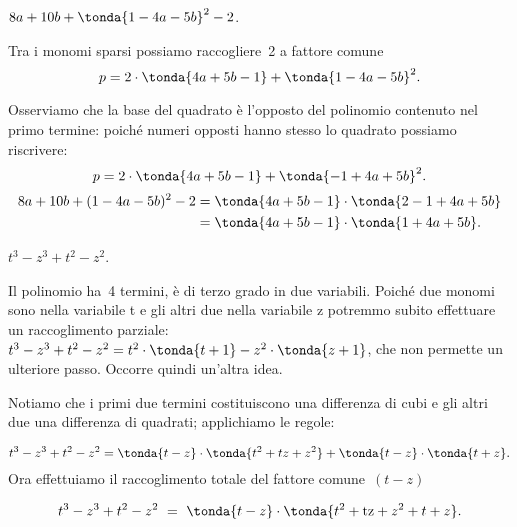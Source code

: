  \begin{esempio}
 \(8a+10b+\tonda{1-4a-5b}^{2}-2\).

Tra i monomi sparsi possiamo raccogliere~2 a fattore comune
\[p=2\cdot \tonda{4a+5b-1}+\tonda{1-4a-5b}^{2}.\]

Osserviamo che la base del quadrato è l'opposto del polinomio contenuto
nel primo termine: poiché numeri opposti hanno
stesso lo quadrato possiamo riscrivere:
\[p=2\cdot\tonda{4a+5b-1}+\tonda{-1+4a+5b}^{2}.\]
\begin{align*}
8a+10b+(1-4a-5b)^{2}-2&=\tonda{4a+5b-1}\cdot\tonda{2-1+4a+5b}\\
&=\tonda{4a+5b-1}\cdot\tonda{1+4a+5b}.
\end{align*}
 \end{esempio}

 \begin{esempio}
 \(t^{{3}}-z^{{3}}+t^{2}-z^{2}\).

Il polinomio ha~4 termini, è di terzo grado in due variabili.
Poiché due monomi sono nella variabile t e gli altri due nella
variabile z potremmo subito effettuare un raccoglimento
parziale:~\(t^{{3}}-z^{{3}}+t^{2}-z^{2}=
           t^{2}\cdot\tonda{t+1}-z^{2}\cdot \tonda{z+1}\),
che non permette un ulteriore passo. Occorre quindi un'altra idea.

Notiamo che i primi due termini costituiscono una differenza di cubi e
gli altri due una differenza di quadrati; applichiamo le regole:

\begin{equation*}
t^{{3}}-z^{{3}}+t^{2}-z^{2}=\tonda{t-z}\cdot
\tonda{t^{2}+tz+z^{2}}+\tonda{t-z}\cdot
\tonda{t+z}.
\end{equation*}
Ora effettuiamo il raccoglimento totale del fattore comune~\((t-z)\)

\begin{equation*}
t^{3}-z^{3}+t^{2}-z^{2}\ =\ \tonda{t-z}\cdot
\tonda{t^{2}+{\text{tz}}+z^{2}+t+z}.
\end{equation*}
 \end{esempio}

